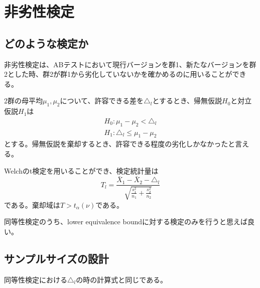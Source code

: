 \section{非劣性検定}

\subsection{どのような検定か}

非劣性検定は、ABテストにおいて現行バージョンを群1、新たなバージョンを群2とした時、群2が群1から劣化していないかを確かめるのに用いることができる。

2群の母平均$\mu_{1}, \mu_{2}$について、許容できる差を$\triangle_{l}$とするとき、帰無仮説$H_{0}$と対立仮説$H_{1}$は
\begin{gather}
    H_{0}: \mu_{1} - \mu_{2} < \triangle_{l} \\
    H_{1}: \triangle_{l} \le \mu_{1} - \mu_{2}
\end{gather}
とする。帰無仮説を棄却するとき、許容できる程度の劣化しかなかったと言える。

Welchのt検定を用いることができ、検定統計量は
\begin{equation}
    T_{l} = \frac{\bar{X}_{1} - \bar{X}_{2} - \triangle_{l}}{\sqrt{\frac{s_{1}^{2}}{n_{1}} + \frac{s_{2}^{2}}{n_{2}}}}
\end{equation}
である。棄却域は$T > t_{\alpha}(\nu)$である。

同等性検定のうち、lower equivalence boundに対する検定のみを行うと思えば良い。

\subsection{サンプルサイズの設計}

同等性検定における$\triangle_{l}$の時の計算式と同じである。
